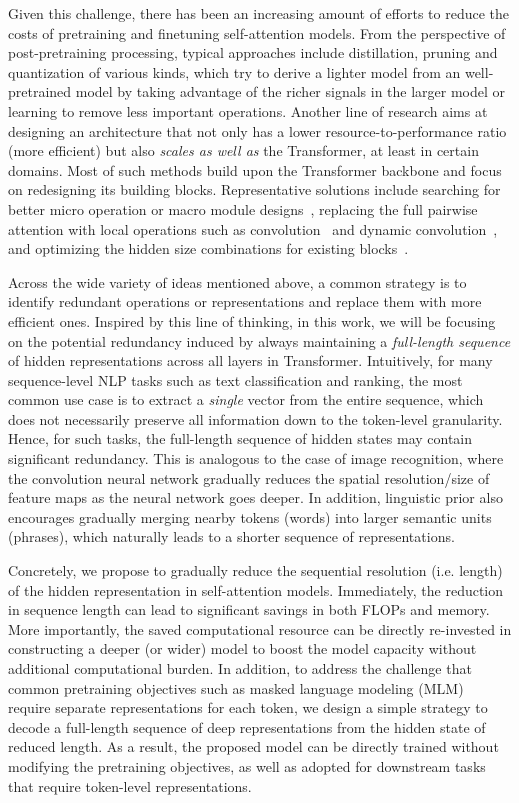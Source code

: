 \documentclass{article}
\theoremstyle{custom}
\begin{document}
Given this challenge, there has been an increasing amount of efforts to reduce the costs of pretraining and finetuning self-attention models.
From the perspective of post-pretraining processing, typical approaches include distillation, pruning and quantization of various kinds, which try to derive a lighter model from an well-pretrained model by taking advantage of the richer signals in the larger model or learning to remove less important operations.
Another line of research aims at designing an architecture that not only has a lower resource-to-performance ratio (more efficient) but also \textit{scales as well as} the Transformer, at least in certain domains.
Most of such methods build upon the Transformer backbone and focus on redesigning its building blocks. 
Representative solutions include searching for better micro operation or macro module designs~\cite{so2019evolved,chen2020adabert}, replacing the full pairwise attention with local operations such as convolution~\cite{wu2020lite} and dynamic convolution~\cite{wu2019pay}, and optimizing the hidden size combinations for existing blocks~\cite{sun2020mobilebert}.

Across the wide variety of ideas mentioned above, a common strategy is to identify redundant operations or representations and replace them with more efficient ones.
Inspired by this line of thinking, in this work, we will be focusing on the potential redundancy induced by always maintaining a \textit{full-length sequence} of hidden representations across all layers in Transformer.
Intuitively, for many sequence-level NLP tasks such as text classification and ranking, the most common use case is to extract a \textit{single} vector from the entire sequence, which does not necessarily preserve all information down to the token-level granularity.
Hence, for such tasks, the full-length sequence of hidden states may contain significant redundancy.
This is analogous to the case of image recognition, where the convolution neural network gradually reduces the spatial resolution/size of feature maps as the neural network goes deeper.
In addition, linguistic prior also encourages gradually merging nearby tokens (words) into larger semantic units (phrases), which naturally leads to a shorter sequence of representations.

Concretely, we propose to gradually reduce the sequential resolution (i.e. length) of the hidden representation in self-attention models.
Immediately, the reduction in sequence length can lead to significant savings in both FLOPs and memory.
More importantly, the saved computational resource can be directly re-invested in constructing a deeper (or wider) model to boost the model capacity without additional computational burden.
In addition, to address the challenge that common pretraining objectives such as masked language modeling (MLM)~\cite{devlin2018bert} require separate representations for each token, we design a simple strategy to decode a full-length sequence of deep representations from the hidden state of reduced length.
As a result, the proposed model can be directly trained without modifying the pretraining objectives, as well as adopted for downstream tasks that require token-level representations.
\end{document}
